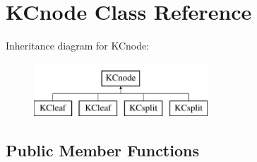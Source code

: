 \hypertarget{class_k_cnode}{
\section{KCnode Class Reference}
\label{class_k_cnode}
}
Inheritance diagram for KCnode:\begin{figure}[H]
\begin{center}
\leavevmode
\includegraphics[height=2cm]{class_k_cnode}
\end{center}
\end{figure}
\subsection*{Public Member Functions}
